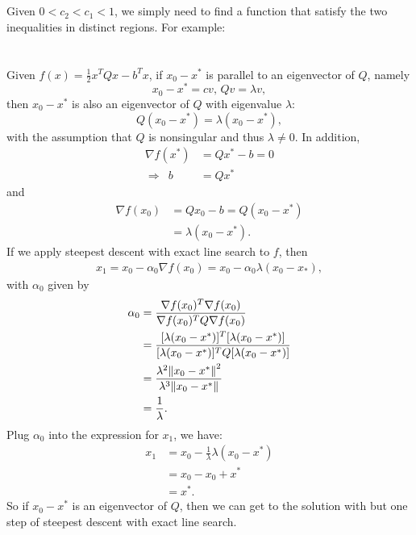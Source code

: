 \documentclass[11pt]{article}
\begin{document}
\maketitle
\section{}
Given $0<c_2<c_1<1$, we simply need to find a function that satisfy the two inequalities in distinct regions. For example:

\section{}
Given $f(x) = \frac12x^TQx-b^Tx$, if $x_0-x^*$ is parallel to an eigenvector of $Q$, namely 
$$x_0 - x^* = cv,\, Qv = \lambda v,$$
then $x_0 - x^*$ is also an eigenvector of $Q$ with eigenvalue $\lambda$:
$$Q(x_0-x^*) = \lambda(x_0-x^*),$$ with the assumption that $Q$ is nonsingular and thus $\lambda\neq0.$ In addition,
\begin{equation}\begin{split} \nabla f(x^*) &= Qx^*-b = 0 \\ \Rightarrow\,\,\, b &= Qx^* \end{split}\nonumber\end{equation} 
and
\begin{equation}\begin{split} \nabla f(x_0) &= Qx_0-b = Q(x_0-x^*)\\&=\lambda(x_0-x^*).\end{split}\nonumber\end{equation} 
If we apply steepest descent with exact line search to $f$, then
\begin{equation}\begin{split} x_1 = x_0 - \alpha_0\nabla f(x_0) = x_0 - \alpha_0\lambda(x_0-x_*),\end{split}\nonumber\end{equation}
with $\alpha_0$ given by
\begin{equation}\begin{split}\alpha_0 &= \frac{\nabla f(x_0)^T\nabla f(x_0)}{\nabla f(x_0)^TQ\nabla f(x_0)} \\
&= \frac{[\lambda(x_0-x^*)]^T[\lambda(x_0-x^*)]}{[\lambda(x_0-x^*)]^TQ[\lambda(x_0-x^*)]}\\
&= \frac{\lambda^2\norm{x_0-x^*}^2}{\lambda^3\norm{x_0-x^*}}\\
&= \frac1{\lambda}.
\end{split}\nonumber\end{equation}
Plug $\alpha_0$ into the expression for $x_1$, we have:
\begin{equation}\begin{split} 
x_1 &= x_0 -\frac1{\lambda}\lambda(x_0-x^*)\\
&=x_0 - x_0 + x^*\\
&=x^*.
\end{split}\nonumber\end{equation} 
So if $x_0-x^*$ is an eigenvector of $Q$, then we can get to the solution with but one step of steepest descent with exact line search.
\end{document}
